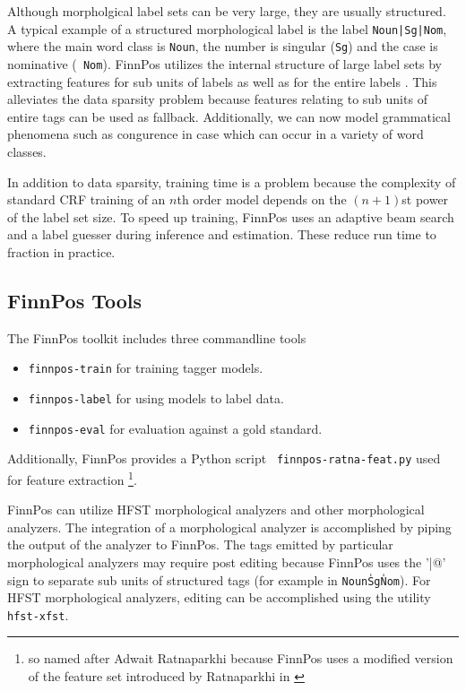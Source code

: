 \documentclass{llncs}
\begin{document}
Although morpholgical label sets can be very large, they are usually
structured. A typical example of a structured morphological label is
the label {\tt Noun|Sg|Nom}, where the main word class is {\tt Noun},
the number is singular ({\tt Sg}) and the case is nominative ({\tt
  Nom}). FinnPos utilizes the internal structure of large label sets
by extracting features for sub units of labels as well as for the
entire labels \cite{silfverberg/2014}. This alleviates the data
sparsity problem because features relating to sub units of entire tags
can be used as fallback. Additionally, we can now model grammatical
phenomena such as congurence in case which can occur in a variety of
word classes.

In addition to data sparsity, training time is a problem because the
complexity of standard CRF training of an $n$th order model depends on
the $(n+1)$st power of the label set size. To speed up training,
FinnPos uses an adaptive beam search and a label guesser
\cite{silfverberg/2015} during inference and estimation. These reduce
run time to fraction in practice.

\subsection{FinnPos Tools}

The FinnPos toolkit includes three commandline tools

\begin{itemize}
\item {\tt finnpos-train} for training tagger models.
\item {\tt finnpos-label} for using models to label data.
\item {\tt finnpos-eval} for evaluation against a gold standard.
\end{itemize}

Additionally, FinnPos provides a Python script {\tt
  finnpos-ratna-feat.py} used for feature extraction \footnote{so
  named after Adwait Ratnaparkhi because FinnPos uses a modified version of
  the feature set introduced by Ratnaparkhi in
  \cite{ratnaparkhi/1996}}.

FinnPos can utilize HFST morphological analyzers and other
morphological analyzers. The integration of a morphological analyzer
is accomplished by piping the output of the analyzer to FinnPos. The
tags emitted by particular morphological analyzers may require post
editing because FinnPos uses the '\verb@|@' sign to separate sub units
of structured tags (for example in {\tt Noun\|Sg\|Nom}). For HFST
morphological analyzers, editing can be accomplished using the utility
{\tt hfst-xfst}.
\end{document}
